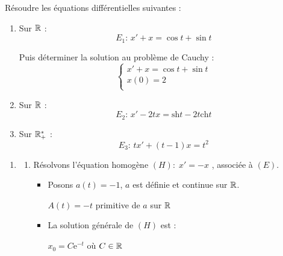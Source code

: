 \documentclass{book}
\begin{document}
\begin{Exercice}
\label{exo:1}
Résoudre les équations différentielles suivantes :
  
\begin{enumerate}
\item Sur $\mathbb{R}$ : $$E_1 :  \, x'+ x= \cos t+\sin t$$

Puis déterminer la solution au problème de Cauchy : 
$$\begin{cases}
x'+ x= \cos t+\sin t  \\
 x(0) = 2  \\
\end{cases}$$

\item Sur $\mathbb{R}$ : $$ E_2 : \, x'-2t x= \mathrm{sh} t   -   2  t   \mathrm{ch} t$$

\item Sur $\mathbb{R}^*_+$ : $$E_3 : \, tx'+(t-1)x= t^2$$
\end{enumerate}
\begin{Correction}
\begin{enumerate}
\item %

	\begin{enumerate}
	\item Résolvons l'équation homogène $(H) : \; x' = - x$ , associée à $(E)$.
		\begin{itemize}

			\item Posons $a(t) = -1$, $a$ est définie et continue sur $\mathbb{R}$.


				\hspace{0.7cm} $A(t) =  - t$ primitive de $a$ sur $\mathbb{R}$

			\item La solution générale de $(H)$ est  :


				\hspace{0.7cm} $x_0 = C  \mathrm{e}^{-t} $ où $C \in \mathbb{R}$	
		\end{itemize}



\end{enumerate}
\end{enumerate}
\end{Correction}
\end{Exercice}
\end{document}
